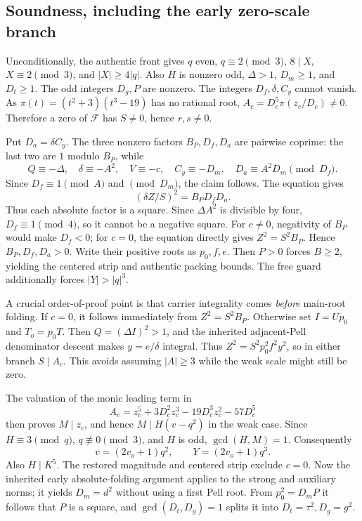 \subsection{Soundness, including the early zero-scale branch}
Unconditionally, the authentic front gives \(q\) even, \(q\equiv2\pmod3\),
\(8\mid X\), \(X\equiv2\pmod3\), and \(|X|\ge4|q|\).
Also \(H\) is nonzero odd, \(\Delta>1\), \(D_m\ge1\), and
\(D_t\ge1\). The odd integers \(D_g,P\) are nonzero. The integers
\(D_f,\delta,C_y\) cannot vanish. As
\(\pi(t)=(t^2+3)(t^3-19)\) has no rational root,
\(A_c=D_c^5\pi(z_c/D_c)\ne0\). Therefore a zero of \(\mathcal F\)
has \(S\ne0\), hence \(r,s\ne0\).

Put \(D_a=\delta C_y\). The three nonzero factors \(B_P,D_f,D_a\)
are pairwise coprime: the last two are \(1\) modulo \(B_P\), while
\[
 Q\equiv-\Delta,\quad \delta\equiv-A^2,\quad
 V\equiv-c,\quad C_y\equiv-D_m,\quad D_a\equiv A^2D_m\pmod{D_f}.
\]
Since \(D_f\equiv1\pmod A\) and \(\pmod{D_m}\), the claim follows.
The equation gives
\[
 (\delta Z/S)^2=B_PD_fD_a.
\]
Thus each absolute factor is a square. Since \(\Delta A^2\) is divisible
by four, \(D_f\equiv1\pmod4\), so it cannot be a negative square.
For \(c\ne0\), negativity of \(B_P\) would make \(D_f<0\); for
\(c=0\), the equation directly gives \(Z^2=S^2B_P\). Hence
\(B_P,D_f,D_a>0\). Write their positive roots as \(p_0,f,e\).
Then \(P>0\) forces \(B\ge2\), yielding the centered strip and authentic
packing bounds. The free guard additionally forces \(|Y|>|q|^3\).

A crucial order-of-proof point is that carrier integrality comes
\emph{before} main-root folding. If \(c=0\), it follows immediately from
\(Z^2=S^2B_P\). Otherwise set \(I=Up_0\) and \(T_o=p_0T\).
Then \(Q=(\Delta I)^2>1\), and the inherited adjacent-Pell denominator
descent makes \(y=e/\delta\) integral. Thus
\(Z^2=S^2p_0^2f^2y^2\), so in either branch \(S\mid A_c\).
This avoids assuming \(|A|\ge3\) while the weak scale might still be zero.

The valuation of the monic leading term in
\[
 A_c=z_c^5+3D_c^2z_c^3-19D_c^3z_c^2-57D_c^5
\]
then proves \(M\mid z_c\), and hence \(M\mid H(v-q^2)\) in the weak
case. Since \(H\equiv3\pmod q\), \(q\not\equiv0\pmod3\), and
\(H\) is odd, \(\gcd(H,M)=1\). Consequently
\[
 v=(2v_o+1)q^2,\qquad Y=(2v_o+1)q^3.
\]
Also \(H\mid K^5\). The restored magnitude and centered strip exclude
\(c=0\). Now the inherited early absolute-folding argument applies to
the strong and auxiliary norms; it yields \(D_m=d^2\) without using a
first Pell root. From \(p_0^2=D_mP\) it follows that \(P\) is a square,
and \(\gcd(D_t,D_g)=1\) splits it into \(D_t=\tau^2,D_g=g^2\).

